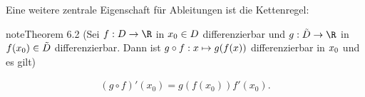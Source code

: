 \documentclass[letterpaper,10pt,english]{jupyterBook}
\begin{document}
Eine weitere zentrale Eigenschaft für Ableitungen ist die Kettenregel:
\label{differential/kombfkt:theorem-3}
\begin{sphinxadmonition}{note}{Theorem 6.2 (Sei \protect\(f: D \rightarrow \R\protect\) in \protect\(x_0 \in D\protect\) differenzierbar und \protect\(g: \tilde D \rightarrow \R\protect\) in \protect\(f(x_0) \in \tilde D\protect\) differenzierbar. Dann ist \protect\(g \circ f: x \mapsto g(f(x))\protect\) differenzierbar in \protect\(x_0\protect\) und es gilt)}


\begin{equation*}
\begin{split} (g\circ f)'(x_0) = g(f(x_0)) f'(x_0).\end{split}
\end{equation*}\end{sphinxadmonition}
\end{document}
